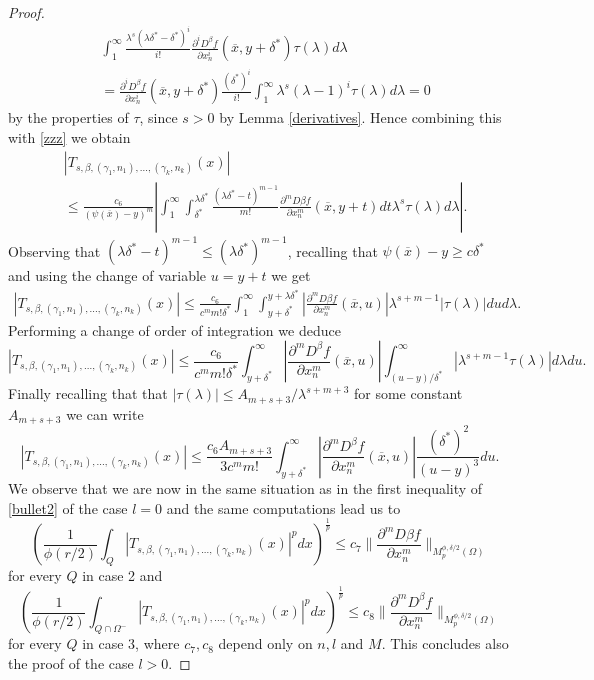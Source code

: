 \documentclass[12pt]{article}
\theoremstyle{definition}
\begin{document}
\begin{proof}
\begin{align*} &\int_1^\infty \frac{\lambda^s(\lambda \delta^*-\delta^*)^i}{i!}\frac{\partial^i D^\beta f}{\partial x_n^i}(\overline x,y+\delta^*)\tau(\lambda)d\lambda \\
&=\frac{\partial^i D^\beta f}{\partial x_n^i}(\overline x,y+\delta^*) \frac{(\delta^*)^i}{i!} \int_1^\infty \lambda^s(\lambda-1)^i\tau(\lambda)d\lambda=0
\end{align*}
by the properties of $\tau$, since $s>0$ by Lemma \ref{derivatives}. Hence combining this with \eqref{zzz} we obtain
\begin{align*}
&|T_{s,\beta,(\gamma_1,n_1),...,(\gamma_k,n_k)}(x) | \\
&\le \frac{c_6}{(\psi(\overline x)-y)^{m}} \left |\int_1^\infty \int_{\delta^*}^{\lambda \delta^*} \frac{(\lambda \delta^*-t)^{m-1}}{m!}\frac{\partial^{m} D\beta f}{\partial x_n^{m} }(\overline x,y+t)dt \lambda^s \tau(\lambda)d\lambda\right |.
\end{align*}
Observing that $(\lambda\delta^*-t)^{m-1}\le (\lambda\delta^*)^{m-1}$, recalling that $\psi(\overline x)-y\ge c \delta^*$ and using the change of variable $u=y+t$ we get
\begin{align*}
|T_{s,\beta,(\gamma_1,n_1),...,(\gamma_k,n_k)}(x) | \le \frac{c_6}{c^mm!\delta^*}\int_1^\infty \int_{y+\delta^*}^{y+\lambda \delta^*} \left|\frac{\partial^{m} D\beta f}{\partial x_n^{m} }(\overline x,u)\right |\lambda^{s+m-1} |\tau(\lambda)|du d\lambda.
\end{align*}
Performing a change of order of integration we deduce
\[ |T_{s,\beta,(\gamma_1,n_1),...,(\gamma_k,n_k)}(x) | \le\frac{c_6}{c^mm!\delta^*}\int_{y+\delta^*}^{\infty} \left |\frac{\partial^{m} D^\beta f}{\partial x_n^{m} }(\overline x,u)\right | \int_{(u-y)/\delta^*}^\infty |\lambda^{s+m-1} \tau(\lambda)| d\lambda du.\]
Finally recalling that that  $|\tau(\lambda)|\le A_{m+s+3}/\lambda^{s+m+3}$ for some constant $A_{m+s+3}$ we can write
\[ |T_{s,\beta,(\gamma_1,n_1),...,(\gamma_k,n_k)}(x) | \le\frac{c_6 A_{m+s+3}}{3c^mm!} \int_{y+\delta^*}^{\infty} \left |\frac{\partial^{m} D^\beta f}{\partial x_n^{m} }(\overline x,u)\right | \frac{(\delta^*)^2}{(u-y)^3} du.\]
We observe that we are now in the same situation as in the first inequality of \eqref{bullet2} of the case $l=0$ and the same computations lead us to
\[\left( \frac{1}{\phi(r/2)}\int_Q  \left| T_{s,\beta,(\gamma_1,n_1),...,(\gamma_k,n_k)}(x)\right|^p dx\right )^{\frac{1}{p}} \le c_7 \bigl\| \frac{\partial^{m} D\beta f}{\partial x_n^{m} } \bigr\|_{M_p^{\phi,\delta/2}(\Omega)} \] 
for every $Q$ in case 2  and
\[\left( \frac{1}{\phi(r/2)}\int_{Q\cap \Omega^-}  \left| T_{s,\beta,(\gamma_1,n_1),...,(\gamma_k,n_k)}(x)\right|^p dx\right )^{\frac{1}{p}} \le c_8 \bigl\| \frac{\partial^{m} D^\beta f}{\partial x_n^{m} } \bigr\|_{M_p^{\phi,\delta/2}(\Omega)} \] 
for every $Q$ in case 3, where $c_7,c_8$ depend only on $n,l$ and $M$. This concludes also the proof of the case $l>0.$
\end{proof} 
\end{document}
